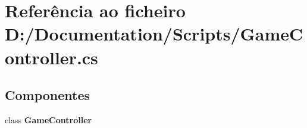 \section{Referência ao ficheiro D\+:/\+Documentation/\+Scripts/\+Game\+Controller.cs}
\label{_game_controller_8cs}
\subsection*{Componentes}
\begin{DoxyCompactItemize}
\item 
class \textbf{ Game\+Controller}
\end{DoxyCompactItemize}
